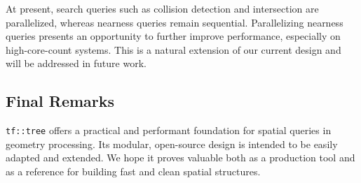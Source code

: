 At present, search queries such as collision detection and 
intersection are parallelized, whereas nearness queries 
remain sequential. Parallelizing nearness queries presents 
an opportunity to further improve performance, especially 
on high-core-count systems. This is a natural extension of 
our current design and will be addressed in future work.

\subsection{Final Remarks}

\texttt{tf::tree} offers a practical and performant 
foundation for spatial queries in geometry processing. Its 
modular, open-source design is intended to be easily 
adapted and extended. We hope it proves valuable both as 
a production tool and as a reference for building fast and 
clean spatial structures.

